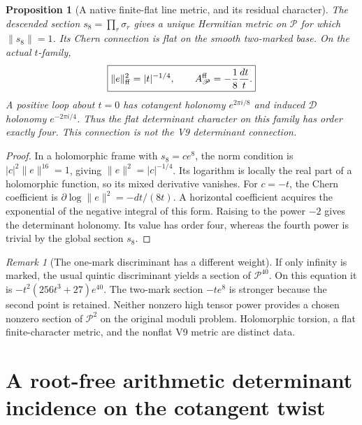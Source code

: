 \documentclass[11pt]{article}
\newtheorem{proposition}[proposition]{Proposition}
\theoremstyle{definition}
\theoremstyle{remark}
\newtheorem{remark}[remark]{Remark}
\begin{document}
\begin{proposition}[A native finite-flat line metric, and its residual character]
\label{prop:v10-flat-line}
The descended section $s_8=\prod_r\sigma_r$ gives a unique Hermitian
metric on $\mathscr P$ for which $\|s_8\|=1$. Its Chern connection
is flat on the smooth two-marked base. On the actual $t$-family,
\begin{equation}
 \boxed{\|e\|^2_{\rm ff}=|t|^{-1/4},\qquad
 A_{\mathscr P}^{\rm ff}=-\frac18\frac{dt}{t}.}
 \label{eq:v10-flat-metric}
\end{equation}
A positive loop about $t=0$ has cotangent holonomy $e^{2\pi i/8}$ and
induced $\mathscr D$ holonomy $e^{-2\pi i/4}$. Thus the flat determinant
character on this family has order exactly four. This connection is not
the V9 determinant connection.
\end{proposition}
\begin{proof}
In a holomorphic frame with $s_8=c e^8$, the norm condition is
$|c|^2\|e\|^{16}=1$, giving $\|e\|^2=|c|^{-1/4}$.
Its logarithm is locally the real part of a holomorphic function, so its
mixed derivative vanishes. For $c=-t$, the Chern coefficient is
$\partial\log\|e\|^2=-dt/(8t)$. A horizontal coefficient acquires
the exponential of the negative integral of this form. Raising to the
power $-2$ gives the determinant holonomy. Its value has order four,
whereas the fourth power is trivial by the global section $s_8$.
\end{proof}

\begin{remark}[The one-mark discriminant has a different weight]
If only infinity is marked, the usual quintic discriminant yields a
section of $\mathscr P^{40}$. On this equation it is
$-t^2(256t^3+27)e^{40}$. The two-mark section $-t e^8$ is stronger
because the second point is retained. Neither nonzero high tensor power
provides a chosen nonzero section of $\mathscr P^2$ on the original
moduli problem. Holomorphic torsion, a flat finite-character metric,
and the nonflat V9 metric are distinct data.
\end{remark}

\section{A root-free arithmetic determinant incidence on the cotangent twist}
\label{sec:v10-incidence}
\end{document}

